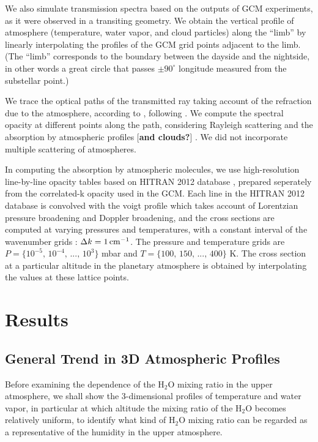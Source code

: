 \documentclass[11pt,numberedappendix,twocolappendix,]{emulateapj}
\def\water{H$_2$O }
\def\memo#1{\color{red}$[${\bf #1}$]$ \color{black}}
\begin{document}
We also simulate transmission spectra based on the outputs of GCM experiments, as it were observed in a transiting geometry. 
We obtain the vertical profile of atmosphere (temperature, water vapor, and cloud particles) along the ``limb'' by linearly interpolating the profiles of the GCM grid points adjacent to the limb. 
(The ``limb'' corresponds to the boundary between the dayside and the nightside, in other words a great circle that passes $\pm 90^{\circ} $ longitude measured from the substellar point.)

We trace the optical paths of the transmitted ray taking account of the refraction due to the atmosphere, according to \citet{vanderWerf2008}, following \citet{Misra2014}. 
We compute the spectral opacity at different points along the path, considering Rayleigh scattering and the absorption by atmospheric profiles \memo{and clouds?}. 
We did not incorporate multiple scattering of atmospheres. 

In computing the absorption by atmospheric molecules, we use high-resolution line-by-line opacity tables based on HITRAN 2012 database \citep{Rothman2013}, prepared seperately from the correlated-k opacity used in the GCM. 
Each line in the HITRAN 2012 database is convolved with the voigt profile which takes account of Lorentzian pressure broadening and Doppler broadening, 
and the cross sections are computed at varying pressures and temperatures, with a constant interval of the wavenumber grids : $\Delta k = 1\,{\rm cm}^{-1}$. 
The pressure and temperature grids are $P = \{10^{-5},\, 10^{-4},\,...,\,10^3\}$ mbar and $T = \{100,\, 150,\,...,\, 400\}$ K. 
The cross section at a particular altitude in the planetary atmosphere is obtained by interpolating the values at these lattice points. 


\section{Results}
\label{s:results}

\subsection{General Trend in 3D Atmospheric Profiles}
\label{ss:result_H2Omixingratio}

Before examining the dependence of the \water mixing ratio in the upper atmosphere, we shall show the 3-dimensional profiles of temperature and water vapor, in particular at which altitude the mixing ratio of the \water becomes relatively uniform, to identify what kind of \water mixing ratio can be regarded as a representative of the humidity in the upper atmosphere. 
\end{document}
